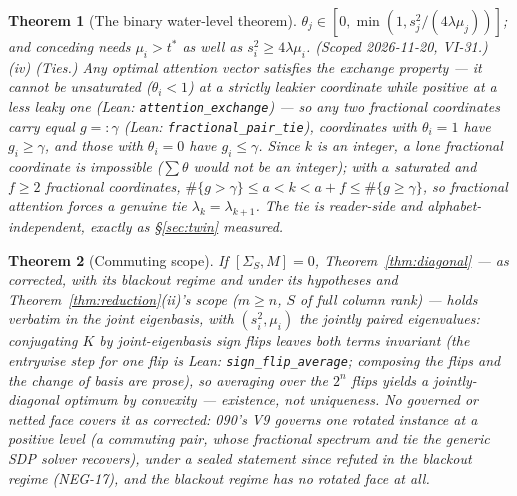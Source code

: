 \documentclass[11pt]{article}
\newtheorem{theorem}{Theorem}
\theoremstyle{definition}
\begin{document}
\begin{theorem}[The binary water-level theorem]
$\theta_j\in[0,\min(1,s_j^2/(4\lambda\mu_j))]$; and conceding needs
$\mu_i>t^\ast$ as well as $s_i^2\ge4\lambda\mu_i$. (Scoped 2026-11-20,
VI-31.)
\emph{(iv) (Ties.)} Any optimal attention vector satisfies the
exchange property --- it cannot be unsaturated ($\theta_i<1$) at a
strictly leakier coordinate while positive at a less leaky one (Lean:
\texttt{attention\_exchange}) --- so any two fractional coordinates
carry \emph{equal} $g=:\gamma$ (Lean: \texttt{fractional\_pair\_tie}),
coordinates with $\theta_i=1$ have $g_i\ge\gamma$, and those with
$\theta_i=0$ have $g_i\le\gamma$. Since $k$ is an integer, a lone
fractional coordinate is impossible ($\sum\theta$ would not be an
integer); with $a$ saturated and $f\ge2$ fractional coordinates,
$\#\{g>\gamma\}\le a<k<a+f\le\#\{g\ge\gamma\}$, so fractional attention
forces a genuine tie $\lambda_k = \lambda_{k+1}$. The tie is
reader-side and alphabet-independent, exactly as \S\ref{sec:twin}
measured.
\end{theorem}

\begin{theorem}[Commuting scope]\label{thm:commuting}
If $[\Sigma_S, M] = 0$, Theorem~\ref{thm:diagonal} --- as corrected,
with its blackout regime and under its hypotheses and Theorem~\ref{thm:reduction}(ii)'s
scope ($m\ge n$, $S$ of full column rank) --- holds verbatim in the joint
eigenbasis, with $(s_i^2, \mu_i)$ the jointly paired eigenvalues:
conjugating $K$ by joint-eigenbasis sign flips leaves both terms
invariant (the entrywise step for one flip is Lean:
\texttt{sign\_flip\_average}; composing the flips and the change of basis
are prose), so averaging over the $2^n$ flips yields a jointly-diagonal
optimum by convexity --- existence, not uniqueness. No governed or
netted face covers it as corrected: 090's V9 governs one rotated
instance at a positive level (a commuting pair, whose fractional
spectrum and tie the generic SDP solver recovers), under a sealed
statement since refuted in the blackout regime (NEG-17), and the
blackout regime has no rotated face at all.
\end{theorem}
\end{document}
